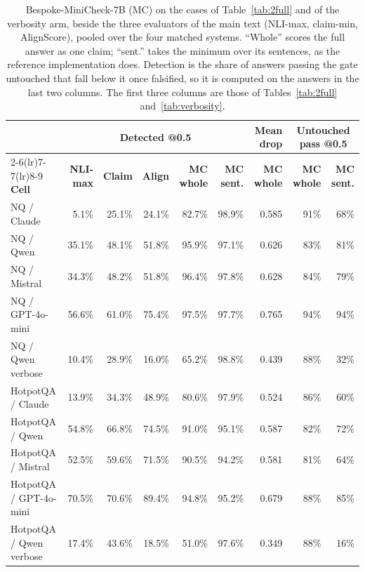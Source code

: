 \documentclass[11pt]{article}
\begin{document}
\begin{table}[t]
\centering
\footnotesize
\setlength{\tabcolsep}{4pt}
\begin{tabular}{lrrrrrrrr}
\toprule
 & \multicolumn{5}{c}{\textbf{Detected @0.5}} & \textbf{Mean drop} & \multicolumn{2}{c}{\textbf{Untouched pass @0.5}} \\
\cmidrule(lr){2-6}\cmidrule(lr){7-7}\cmidrule(lr){8-9}
\textbf{Cell} & \textbf{NLI-max} & \textbf{Claim} & \textbf{Align} & \textbf{MC whole} & \textbf{MC sent.} & \textbf{MC whole} & \textbf{MC whole} & \textbf{MC sent.} \\
\midrule
NQ / Claude & 5.1\% & 25.1\% & 24.1\% & 82.7\% & 98.9\% & 0.585 & 91\% & 68\% \\
NQ / Qwen & 35.1\% & 48.1\% & 51.8\% & 95.9\% & 97.1\% & 0.626 & 83\% & 81\% \\
NQ / Mistral & 34.3\% & 48.2\% & 51.8\% & 96.4\% & 97.8\% & 0.628 & 84\% & 79\% \\
NQ / GPT-4o-mini & 56.6\% & 61.0\% & 75.4\% & 97.5\% & 97.7\% & 0.765 & 94\% & 94\% \\
NQ / Qwen verbose & 10.4\% & 28.9\% & 16.0\% & 65.2\% & 98.8\% & 0.439 & 88\% & 32\% \\
\midrule
HotpotQA / Claude & 13.9\% & 34.3\% & 48.9\% & 80.6\% & 97.9\% & 0.524 & 86\% & 60\% \\
HotpotQA / Qwen & 54.8\% & 66.8\% & 74.5\% & 91.0\% & 95.1\% & 0.587 & 82\% & 72\% \\
HotpotQA / Mistral & 52.5\% & 59.6\% & 71.5\% & 90.5\% & 94.2\% & 0.581 & 81\% & 64\% \\
HotpotQA / GPT-4o-mini & 70.5\% & 70.6\% & 89.4\% & 94.8\% & 95.2\% & 0.679 & 88\% & 85\% \\
HotpotQA / Qwen verbose & 17.4\% & 43.6\% & 18.5\% & 51.0\% & 97.6\% & 0.349 & 88\% & 16\% \\
\bottomrule
\end{tabular}
\caption{Bespoke-MiniCheck-7B (MC) on the cases of Table~\ref{tab:2full} and of the verbosity arm, beside the three evaluators of the main text (NLI-max, claim-min, AlignScore), pooled over the four matched systems. ``Whole'' scores the full answer as one claim; ``sent.'' takes the minimum over its sentences, as the reference implementation does. Detection is the share of answers passing the gate untouched that fall below it once falsified, so it is computed on the answers in the last two columns. The first three columns are those of Tables~\ref{tab:2full} and~\ref{tab:verbosity}.}
\label{tab:minicheck}
\end{table}
\end{document}
